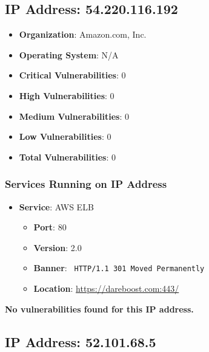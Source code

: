 \documentclass{article}
\begin{document}
\clearpage



\subsection*{IP Address: 54.220.116.192}

\begin{itemize}
    \item \textbf{Organization}: Amazon.com, Inc.
    \item \textbf{Operating System}:  N/A 
    \item \textbf{Critical Vulnerabilities}: 0
    \item \textbf{High Vulnerabilities}: 0
    \item \textbf{Medium Vulnerabilities}: 0
    \item \textbf{Low Vulnerabilities}: 0
    \item \textbf{Total Vulnerabilities}: 0
\end{itemize}

\subsubsection*{Services Running on IP Address}

\begin{itemize}
    
        \item \textbf{Service}: AWS ELB
        \begin{itemize}
            \item \textbf{Port}: 80
            \item \textbf{Version}:  2.0 
            \item \textbf{Banner}: \texttt{
                HTTP/1.1 301 Moved Permanently
            }
            \item \textbf{Location}: \href{ https://dareboost.com:443/ }{ https://dareboost.com:443/ }
        \end{itemize}
    
\end{itemize}


\textbf{No vulnerabilities found for this IP address.}




\clearpage



\subsection*{IP Address: 52.101.68.5}
\end{document}
